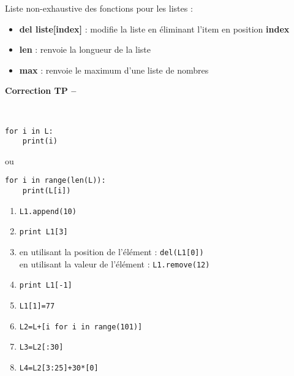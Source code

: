 Liste non-exhaustive des fonctions pour les listes :
\begin{itemize}
\item \textbf{del liste[index]} : modifie la liste en \' eliminant l'item en position \textbf{index}
\item \textbf{len} : renvoie la longueur de la liste
\item \textbf{max} : renvoie le maximum d'une liste de nombres
\end{itemize}














\ifdef{\public}{}{}

\newpage 

\begin{center}
{\Large\bf Correction TP \no {\numero} -- \descrip}
\end{center}



\begin{solution}~\\
\vspace{-0.7cm}
\begin{verbatim}
for i in L:
    print(i)
\end{verbatim}
ou 
\begin{verbatim}
for i in range(len(L)):
	print(L[i])
\end{verbatim}
\end{solution}



\begin{solution}
\begin{enumerate}
\item \verb?L1.append(10)?
\item \verb?print L1[3]?
\item en utilisant la position de l'\' el\' ement : \verb?del(L1[0])? \\
en utilisant la valeur de l'\' el\' ement : \verb?L1.remove(12)?
\item \verb?print L1[-1]?
\item \verb?L1[1]=77?
\item \verb?L2=L+[i for i in range(101)]?
\item \verb?L3=L2[:30]?
\item \verb?L4=L2[3:25]+30*[0]?
\end{enumerate}
\end{solution}




